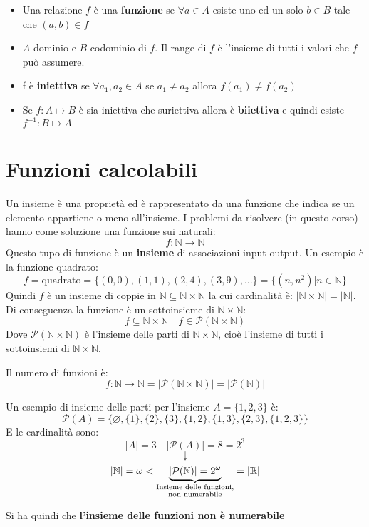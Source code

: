 \documentclass[a4paper]{article}
\begin{document}
\begin{itemize}
    \item Una relazione $f$ è una \textbf{funzione} se $\forall a \in A$ esiste uno ed un solo $b \in B$ tale che $(a,b) \in f$
    \item $A$ dominio e $B$ codominio di $f$. Il range di $f$ è l'insieme di tutti i valori che $f$ può assumere.
    \item f è \textbf{iniettiva} se $\forall a_1,a_2 \in A$ se $a_1 \neq a_2$ allora $f(a_1) \neq f(a_2)$
    \item Se $f : A \mapsto B$ è sia iniettiva che suriettiva allora è \textbf{biiettiva} e quindi esiste $f^{-1} : B \mapsto A$ 
\end{itemize}

\section{Funzioni calcolabili}
Un insieme è una proprietà ed è rappresentato da una funzione che indica se un elemento
appartiene o meno all'insieme. I problemi da risolvere (in questo corso) hanno come
soluzione una funzione sui naturali:
\[
  f : \mathbb{N} \to \mathbb{N}
\] 
Questo tupo di funzione è un \textbf{insieme} di associazioni input-output. Un esempio
è la funzione quadrato:
\[
  f = \text{quadrato} = \{(0,0), (1,1), (2,4), (3,9), \ldots\} = \{(n,n^2) | n \in \mathbb{N}\}
\] 
Quindi \( f \) è un insieme di coppie in \( \mathbb{N} \subseteq \mathbb{N} \times \mathbb{N} \) la
cui cardinalità è: \( \left| \mathbb{N} \times \mathbb{N} \right| =
\left| \mathbb{N} \right| \). Di conseguenza la funzione è un sottoinsieme di \( \mathbb{N}
\times \mathbb{N}\):
\[
  f \subseteq \mathbb{N} \times \mathbb{N} \quad f \in \mathcal{P}(\mathbb{N} \times \mathbb{N})
\] 
Dove \( \mathcal{P}(\mathbb{N} \times \mathbb{N}) \) è l'insieme delle parti di \( \mathbb{N}
\times \mathbb{N} \), cioè l'insieme di tutti i sottoinsiemi di \( \mathbb{N} \times
\mathbb{N} \).

Il numero di funzioni è:
\[
  f: \mathbb{N} \to \mathbb{N} = \left| \mathcal{P}(\mathbb{N} \times \mathbb{N}) \right| 
  = \left| \mathcal{P}(\mathbb{N}) \right| 
\] 
\begin{example}
  Un esempio di insieme delle parti per l'insieme \( A = \{1,2,3\} \) è:
  \[
    \mathcal{P}(A) = \{\varnothing, \{1\}, \{2\}, \{3\}, \{1,2\}, \{1,3\}, \{2,3\}, \{1,2,3\}\}
  \] 
  E le cardinalità sono:
  \[
    \left| A \right| = 3 \quad \left| \mathcal{P}(A) \right| = 8 = 2^3
  \] 
  \[
    \downarrow
  \] 
  \[
    \left| \mathbb{N} \right| = \omega < 
    \underbrace{\left| \mathcal{P}(\mathbb{N}) \right| = 2^{\omega}}_{%
      \substack{\text{Insieme delle funzioni,}\\ 
      \text{non numerabile}}
    }
    = \left| \mathbb{R} \right| 
  \] 
\end{example}
Si ha quindi che \textbf{l'insieme delle funzioni non è numerabile}
\end{document}

